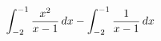$\displaystyle\int_{-2}^{-1} \dfrac{x^2}{x-1}\mkern3mu dx-\int_{-2}^{-1} \dfrac{1}{x-1}\mkern3mu dx$
